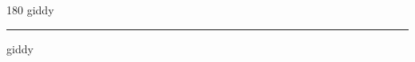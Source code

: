 
\begin{frame}
\begin{center}
\begin{turn}{180}
{\fontsize{2.5cm}{1em}\selectfont giddy}
\end{turn}
\vspace{1em}\par  
\hrule
\vspace{1em}\par  
{\fontsize{2.5cm}{1em}\selectfont giddy}
\end{center}
\end{frame}
